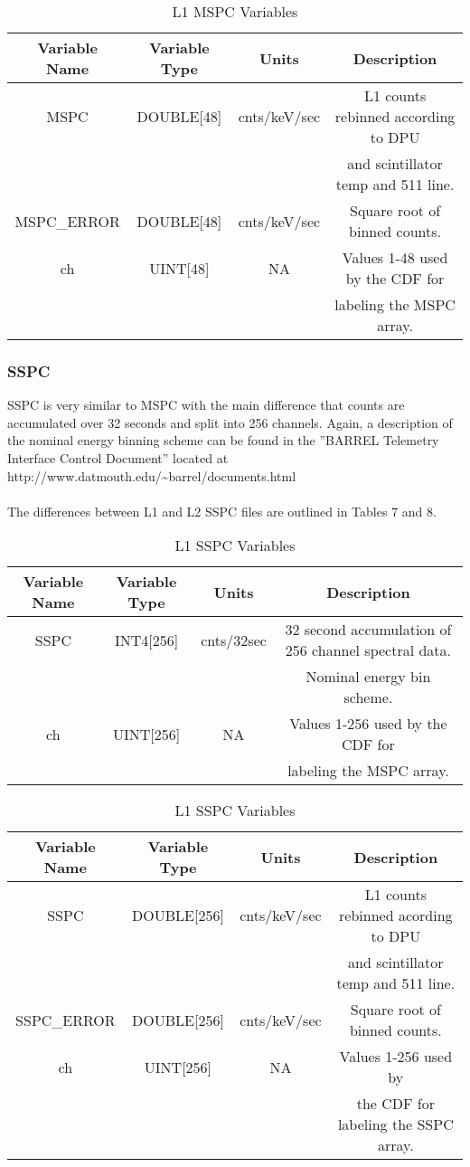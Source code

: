 \documentclass{article}
\begin{document}
\begin{table}[H]
\caption{L1 MSPC Variables}
\begin{tabular}{|c|c|c|c|}
\hline
Variable Name&Variable Type&Units&Description\\ \hline
MSPC&DOUBLE[48]&cnts/keV/sec&L1 counts rebinned according to DPU\\
~&~&~&and scintillator temp and 511 line.\\ 
MSPC\_ERROR&DOUBLE[48]&cnts/keV/sec&Square root of binned counts.\\ 
ch&UINT[48]&NA&Values 1-48 used by the CDF for\\
~&~&~&labeling the MSPC array.\\
\hline
\end{tabular}
\end{table}

\subsubsection{SSPC}
SSPC is very similar to MSPC with the main difference that counts are accumulated over 32 seconds and split into 256 channels. Again, a description of the nominal energy binning scheme can be found  in the ''BARREL Telemetry Interface Control Document'' located at http://www.datmouth.edu/\~{}barrel/documents.html\\\\
The differences between L1 and L2 SSPC files are outlined in Tables 7 and 8.

\begin{table}[H]
\caption{L1 SSPC Variables}
\begin{tabular}{|c|c|c|c|}
\hline
Variable Name&Variable Type&Units&Description\\ \hline
SSPC&INT4[256]&cnts/32sec&32 second accumulation of 256 channel spectral data.\\
~&~&~&Nominal energy bin scheme.\\ 
ch&UINT[256]&NA&Values 1-256 used by the CDF for\\
~&~&~&labeling the MSPC array.\\
\hline
\end{tabular}
\end{table}

\begin{table}[H]
\caption{L1 SSPC Variables}
\begin{tabular}{|c|c|c|c|}
\hline
Variable Name&Variable Type&Units&Description\\ \hline
SSPC&DOUBLE[256]&cnts/keV/sec&L1 counts rebinned acording to DPU\\
~&~&~&and scintillator temp and 511 line.\\ 
SSPC\_ERROR&DOUBLE[256]&cnts/keV/sec&Square root of binned counts.\\ 
ch&UINT[256]&NA&Values 1-256 used by\\
~&~&~&the CDF for labeling the SSPC array.\\
\hline
\end{tabular}
\end{table}
\end{document}
